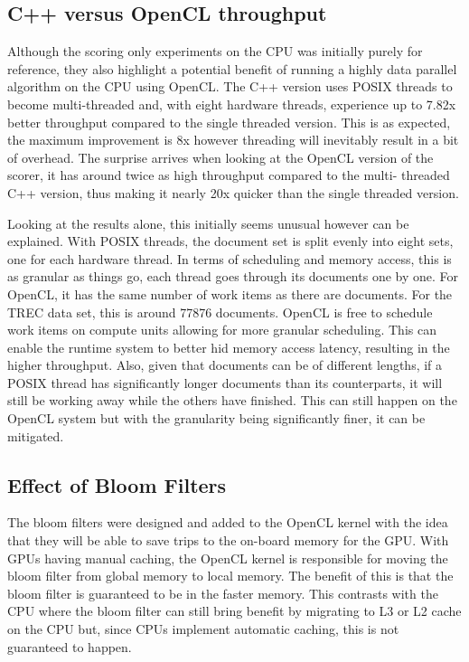 \subsection{C++ versus OpenCL throughput}

Although the scoring only experiments on the CPU was initially purely for
reference, they also highlight a potential benefit of running a highly data
parallel algorithm on the CPU using OpenCL. The C++ version uses POSIX threads
to become multi-threaded and, with eight hardware threads, experience up to
7.82x better throughput compared to the single threaded version. This is as
expected, the maximum improvement is 8x however threading will inevitably result
in a bit of overhead. The surprise arrives when looking at the OpenCL version of
the scorer, it has around twice as high throughput compared to the multi-
threaded C++ version, thus making it nearly 20x quicker than the single threaded
version.

Looking at the results alone, this initially seems unusual however can be
explained. With POSIX threads, the document set is split evenly into eight sets,
one for each hardware thread. In terms of scheduling and memory access, this is
as granular as things go, each thread goes through its documents one by one. For
OpenCL, it has the same number of work items as there are documents. For the
TREC data set, this is around 77876 documents. OpenCL is free to schedule work
items on compute units allowing for more granular scheduling. This can enable
the runtime system to better hid memory access latency, resulting in the higher
throughput. Also, given that documents can be of different lengths, if a POSIX
thread has significantly longer documents than its counterparts, it will still
be working away while the others have finished. This can still happen on the
OpenCL system but with the granularity being significantly finer, it can be
mitigated.

\subsection{Effect of Bloom Filters}

The bloom filters were designed and added to the OpenCL kernel with the idea
that they will be able to save trips to the on-board memory for the GPU. With
GPUs having manual caching, the OpenCL kernel is responsible for moving the
bloom filter from global memory to local memory. The benefit of this is that the
bloom filter is guaranteed to be in the faster memory. This contrasts with the
CPU where the bloom filter can still bring benefit by migrating to L3 or L2
cache on the CPU but, since CPUs implement automatic caching, this is not
guaranteed to happen.


